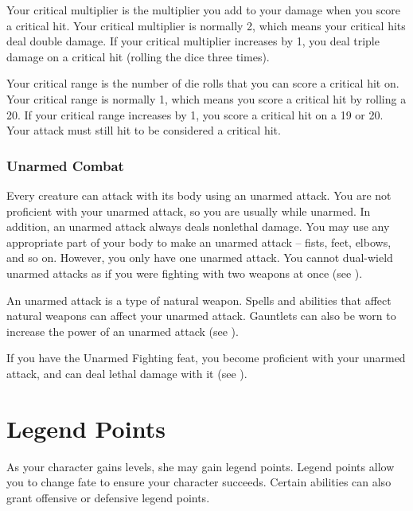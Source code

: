              Your critical multiplier is the multiplier you add to your damage when you score a critical hit.
            Your critical multiplier is normally 2, which means your critical hits deal double damage.
            If your critical multiplier increases by 1, you deal triple damage on a critical hit (rolling the dice three times).

             Your critical range is the number of die rolls that you can score a critical hit on.
            Your critical range is normally 1, which means you score a critical hit by rolling a 20.
            If your critical range increases by 1, you score a critical hit on a 19 or 20.
            Your attack must still hit to be considered a critical hit.

        \subsubsection{Unarmed Combat}\label{Unarmed Combat}
            Every creature can attack with its body using an unarmed attack.
            You are not proficient with your unarmed attack, so you are usually  while unarmed.
            In addition, an unarmed attack always deals nonlethal damage.
            You may use any appropriate part of your body to make an unarmed attack -- fists, feet, elbows, and so on.
            However, you only have one unarmed attack.
            You cannot dual-wield unarmed attacks as if you were fighting with two weapons at once (see ).

            An unarmed attack is a type of natural weapon.
            Spells and abilities that affect natural weapons can affect your unarmed attack.
            Gauntlets can also be worn to increase the power of an unarmed attack (see ).

            If you have the Unarmed Fighting feat, you become proficient with your unarmed attack, and can deal lethal damage with it (see ).

\section{Legend Points}\label{Legend Points}

    As your character gains levels, she may gain legend points.
    Legend points allow you to change fate to ensure your character succeeds.
    Certain abilities can also grant offensive or defensive legend points.

